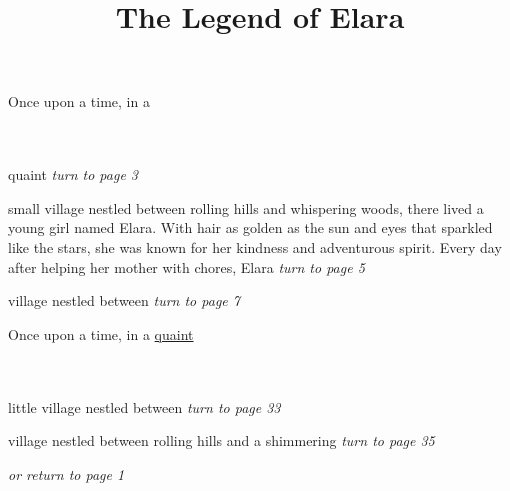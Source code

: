\documentclass{memoir}
\author{}
\title{\HUGE The Legend of Elara}
\begin{document}
            \maketitle
            \thispagestyle{empty} 
            \mainmatter
            

        \hspace{1cm}\vfill
        \begin{minipage}{3in}
        \LARGE
        Once upon a time, in a \\ \vspace{5mm} \\
  \\ 

        \hspace{1cm}\begin{minipage}{6cm}
        \normalsize
            quaint  \hfill \textit{turn to page 3}\\ \vspace{5mm}

small village nestled between rolling hills and whispering woods, there lived a young girl named Elara. With hair as golden as the sun and eyes that sparkled like the stars, she was known for her kindness and adventurous spirit. Every day after helping her mother with chores, Elara \hfill \textit{turn to page 5}\\ \vspace{5mm}

village nestled between  \hfill \textit{turn to page 7}\\ \vspace{5mm}


        \end{minipage} 
        \end{minipage}
        \hspace{1cm}\vfill
        \cleardoublepage

        


        \hspace{1cm}\vfill
        \begin{minipage}{3in}
        \LARGE
        Once upon a time, in a \ul{quaint}\\ \vspace{5mm} \\
  \\ 

        \hspace{1cm}\begin{minipage}{6cm}
        \normalsize
            little village nestled between  \hfill \textit{turn to page 33}\\ \vspace{5mm}

village nestled between rolling hills and a shimmering  \hfill \textit{turn to page 35}\\ \vspace{5mm}

\hfill \textit{or return to page 1}
        \end{minipage} 
        \end{minipage}
        \hspace{1cm}\vfill
        \cleardoublepage
\end{document}
